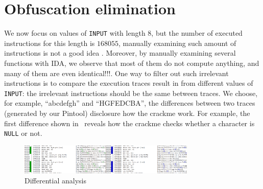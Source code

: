 \documentclass{easychair}
\begin{document}
\section{Obfuscation elimination}
We now focus on values of \texttt{INPUT} with length $8$, but the number of executed instructions for this length is $168055$, manually examining such amount of instructions is not a good idea \smiley{}. Moreover, by manually examining several functions with IDA, we observe that most of them do not compute anything, and  many of them are even  identical!!!. One way to filter out such irrelevant instructions is to compare the execution traces result in from different values of \texttt{INPUT}: the irrelevant instructions should be the same between traces. We choose, for example, ``abcdefgh'' and ``HGFEDCBA'', the differences between two traces (generated by our Pintool) disclosure how the crackme work. For example, the first difference shown in~ reveals how the crackme checks whether a character is \texttt{NULL} or not.

\begin{figure}[ht]
  \centering
  \includegraphics[width=0.75\textwidth,keepaspectratio]{difference.png}
  \caption{Differential analysis}\label{fig:difference}
\end{figure}
\end{document}
